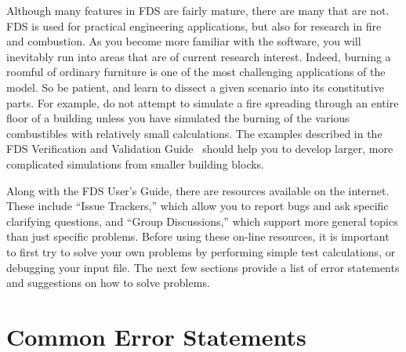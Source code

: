\documentclass[11pt]{book}
\begin{document}
Although many features in FDS are fairly mature, there are many that are not. FDS is used for practical engineering applications, but also for
research in fire and combustion. As you become more familiar with the software, you will inevitably run into areas that are of current research
interest. Indeed, burning a roomful of ordinary furniture is one of the most challenging applications of the model. So be patient, and learn to
dissect a given scenario into its constitutive parts. For example, do not attempt to simulate a fire spreading through an entire floor of a
building unless you have simulated the burning of the various combustibles with relatively small calculations. The examples described in the
FDS Verification and Validation Guide~\cite{FDS_VV_Guide_5} should help you to develop larger, more complicated simulations from smaller building blocks.

Along with the FDS User's Guide, there are resources
available on the internet. These include ``Issue Trackers,'' which allow you to report bugs and ask specific clarifying questions, and ``Group Discussions,'' which
support more general topics than just specific problems. Before using these on-line resources, it is important to first try to solve your own problems by
performing simple test calculations, or debugging your input file. The next few sections provide a list of error statements and suggestions on how to solve
problems.

\section{Common Error Statements}%
\end{document}
